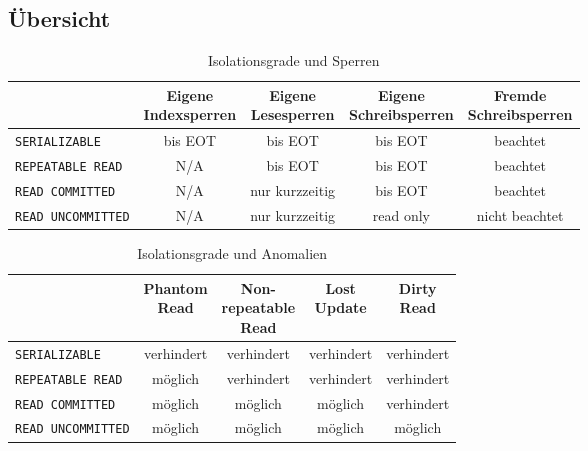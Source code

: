 		\subsection{Übersicht} %
			\begin{table}[H]
				\centering
				\begin{tabular}{l | c | c | c | c}
					                             & \makecell{Eigene \\ Indexsperren} & \makecell{Eigene \\ Lesesperren} & \makecell{Eigene \\ Schreibsperren} & \makecell{Fremde \\ Schreibsperren} \\ \hline
					\lstinline|SERIALIZABLE|     & bis EOT                           & bis EOT                          & bis EOT                             & beachtet                            \\
					\lstinline|REPEATABLE READ|  & N/A                               & bis EOT                          & bis EOT                             & beachtet                            \\
					\lstinline|READ COMMITTED|   & N/A                               & nur kurzzeitig                   & bis EOT                             & beachtet                            \\
					\lstinline|READ UNCOMMITTED| & N/A                               & nur kurzzeitig                   & read only                           & nicht beachtet
				\end{tabular}
				\caption{Isolationsgrade und Sperren}
			\end{table}

			\begin{table}[H]
				\centering
				\begin{tabular}{l | c | c | c | c}
					                             & \makecell{Phantom \\ Read} & \makecell{Non- \\ repeatable \\ Read} & \makecell{Lost \\ Update} & \makecell{Dirty \\ Read} \\ \hline
					\lstinline|SERIALIZABLE|     & verhindert                 & verhindert                            & verhindert                & verhindert               \\
					\lstinline|REPEATABLE READ|  & möglich                    & verhindert                            & verhindert                & verhindert               \\
					\lstinline|READ COMMITTED|   & möglich                    & möglich                               & möglich                   & verhindert               \\
					\lstinline|READ UNCOMMITTED| & möglich                    & möglich                               & möglich                   & möglich
				\end{tabular}
				\caption{Isolationsgrade und Anomalien}
			\end{table}

